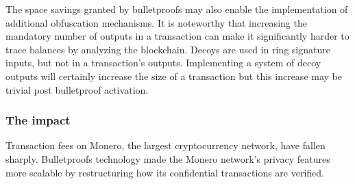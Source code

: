 The space savings granted by bulletproofs may also enable the implementation of additional obfuscation mechanisms. It is noteworthy that increasing the mandatory number of outputs in a transaction can make it significantly harder to trace balances by analyzing the blockchain. Decoys are used in ring signature inputs, but not in a transaction’s outputs. Implementing a system of decoy outputs will certainly increase the size of a transaction but this increase may be trivial post bulletproof activation.

\subsubsection{The impact}
Transaction fees on Monero, the  largest cryptocurrency network, have fallen sharply. Bulletproofs technology made the Monero network’s privacy features more scalable by restructuring how its confidential transactions are verified.

